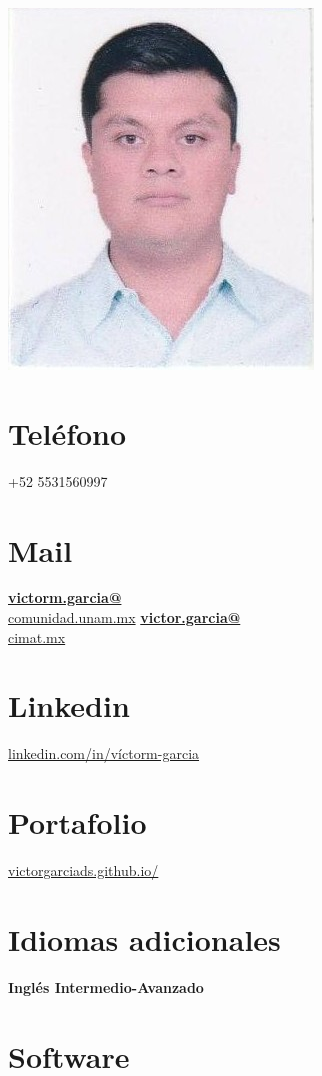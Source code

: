 \documentclass[]{friggeri-cv}
\begin{document}
\begin{aside}
  \includegraphics[scale=0.268]{img/foto2.png}
  \section{Teléfono}
    +52 5531560997
  \section{Mail}
    \href{mailto:victorm.garcia@comunidad.unam.mx}{\textbf{victorm.garcia@}\\comunidad.unam.mx}
    \href{mailto:victor.garcia@cimat.mx}{\textbf{victor.garcia@}\\cimat.mx}
    \section{Linkedin}
    \url{linkedin.com/in/víctorm-garcia}%
    \section{Portafolio}
    \url{victorgarciads.github.io/}%
     \section{Idiomas adicionales}
    \textbf{Inglés Intermedio-Avanzado}
  \section{Software}
   \vspace{3mm}

\end{aside}
\end{document}
